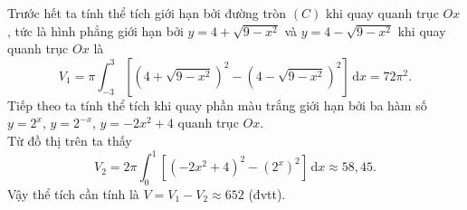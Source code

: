 \begin{bt}
{\begin{itemize}
		\end{itemize}
		Trước hết ta tính thể tích giới hạn bởi đường tròn $(C)$ khi  quay quanh trục $Ox$, tức là hình phẳng giới hạn bởi $y=4+\sqrt{9-x^2}$ và $y=4-\sqrt{9-x^2}$ khi quay quanh trục $Ox$ là
		 $$V_1=\pi \displaystyle\int_{-3}^3\left[\left(4+\sqrt{9-x^2}\right)^2-\left(4-\sqrt{9-x^2}\right)^2\right]\mathrm{\,d} x =72\pi^2.$$
		Tiếp theo ta tính thể tích khi  quay phần màu trắng giới hạn bởi ba hàm số $y=2^x$, $y=2^{-x}$, $y=-2x^2+4$ quanh trục $Ox$.\\
		Từ đồ thị trên ta thấy 
		$$V_2=2 \pi \displaystyle\int_0^1\left[\left(-2 x^2+4\right)^2-(2^x)^2\right] \mathrm{\,d} x\approx 58{,}45.$$ 
		Vậy thể tích cần tính là $V=V_1-V_2\approx 652$ (đvtt). 
	} 
\end{bt}

